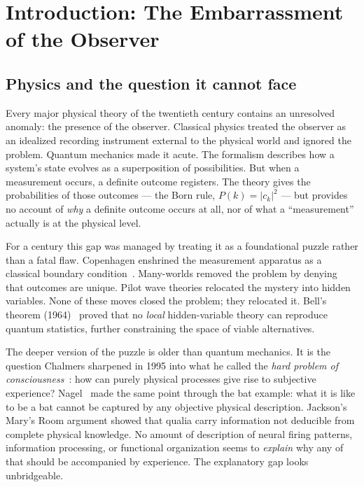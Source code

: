 \documentclass[11pt]{article}
\theoremstyle{remark}
\begin{document}
\newpage
\setcounter{tocdepth}{2}
\tableofcontents
\newpage

\section{Introduction: The Embarrassment of the Observer}\label{sec:intro}

\subsection{Physics and the question it cannot face}

Every major physical theory of the twentieth century contains an unresolved anomaly:
the presence of the observer. Classical physics treated the observer as an idealized
recording instrument external to the physical world and ignored the problem. Quantum
mechanics made it acute. The formalism describes how a system's state evolves as a
superposition of possibilities. But when a measurement occurs, a definite outcome
registers. The theory gives the probabilities of those outcomes --- the Born rule,
$P(k) = |c_k|^2$ --- but provides no account of \emph{why} a definite outcome occurs
at all, nor of what a ``measurement'' actually is at the physical level.

For a century this gap was managed by treating it as a foundational puzzle rather than
a fatal flaw. Copenhagen enshrined the measurement apparatus as a classical boundary
condition~\cite{vonNeumann1955}. Many-worlds removed the problem by denying that
outcomes are unique. Pilot wave theories relocated the mystery into hidden variables.
None of these moves closed the problem; they relocated it. Bell's theorem
(1964)~\cite{Bell1964} proved that no \emph{local} hidden-variable theory can
reproduce quantum statistics, further constraining the space of viable alternatives.

The deeper version of the puzzle is older than quantum mechanics. It is the question
Chalmers sharpened in 1995 into what he called the \emph{hard problem of
consciousness}~\cite{Chalmers1995,chalmers1996}: how can purely physical processes
give rise to subjective experience? Nagel~\cite{Nagel1974} made the same point through
the bat example: what it is like to be a bat cannot be captured by any objective
physical description. Jackson's~\cite{Jackson1982} Mary's Room argument showed that
qualia carry information not deducible from complete physical knowledge. No amount of
description of neural firing patterns, information processing, or functional
organization seems to \emph{explain} why any of that should be accompanied by
experience. The explanatory gap looks unbridgeable.
\end{document}
